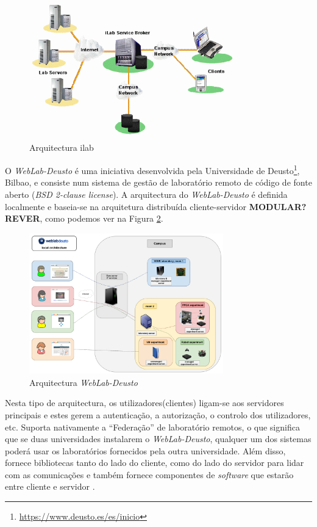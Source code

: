 \begin{figure}[hbtp]
    \centering
    \includegraphics[width=0.8\textwidth]{figures/isa_architecture.png}
    \caption{Arquitectura \acrshort{ilab}\cite{arquitecturaisa}}
    \label{fig:arquitecturaisa}
\end{figure}

O \textit{WebLab-Deusto} é uma iniciativa desenvolvida pela Universidade de Deusto\footnote{\url{https://www.deusto.es/es/inicio}}, Bilbao, e consiste num sistema de gestão de \acrshort{laboratório remoto} de código de fonte aberto (\textit{BSD 2-clause license}). A arquitectura do \textit{WebLab-Deusto} é definida localmente e baseia-se na arquitetura distribuída cliente-servidor \textbf{MODULAR? REVER}, como podemos ver na Figura \ref{fig:arquitecturawld}.

\begin{figure}[hbtp]
    \centering
    \includegraphics[width=0.75\textwidth]{figures/local_architecture.png}
    \caption{Arquitectura \textit{WebLab-Deusto}}
    \label{fig:arquitecturawld}
\end{figure}

Nesta tipo de arquitectura, os utilizadores(clientes) ligam-se aos servidores principais e estes gerem a autenticação, a autorização, o controlo dos utilizadores, etc.
Suporta nativamente a ``Federação'' de \acrshort{laboratório remoto}s, o que significa que se duas universidades instalarem o \textit{WebLab-Deusto}, qualquer um dos sistemas poderá usar os laboratórios fornecidos pela outra universidade.
Além disso, fornece bibliotecas tanto do lado do cliente, como do lado do servidor para lidar com as comunicações e também fornece componentes de \textit{software} que estarão entre cliente e servidor \cite{wlddoc}.

